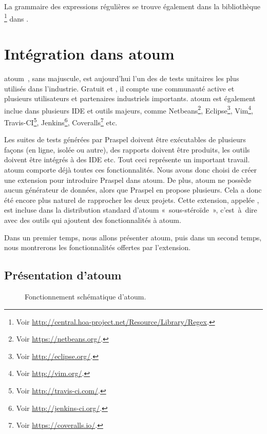 La grammaire des expressions régulières se trouve également dans la bibliothèque
\footnote{Voir
\url{http://central.hoa-project.net/Resource/Library/Regex}.} dans
.

\section{Intégration dans atoum}
\label{section:tools:atoum}

atoum~, sans majuscule, est aujourd'hui l'un des
 de tests unitaires les plus utilisés dans l'industrie. Gratuit et
, il compte une communauté active et plusieurs
utilisateurs et partenaires industriels importants. atoum est également inclue
dans plusieurs IDE et outils majeurs, comme Netbeans\footnote{Voir
\url{https://netbeans.org/}.}, Eclipse\footnote{Voir
\url{http://eclipse.org/}.}, Vim\footnote{Voir \url{http://vim.org/}.},
Travis-CI\footnote{Voir \url{http://travis-ci.com/}.}, Jenkins\footnote{Voir
\url{http://jenkins-ci.org/}.}, Coveralls\footnote{Voir
\url{https://coveralls.io/}.} etc.

Les suites de tests générées par Praspel doivent être exécutables de plusieurs
façons (en ligne, isolée ou autre), des rapports doivent être produits, les
outils doivent être intégrés à des IDE etc. Tout ceci représente un important
travail. atoum comporte déjà toutes ces fonctionnalités. Nous avons donc choisi
de créer une extension pour introduire Praspel dans atoum. De plus, atoum ne
possède aucun générateur de données, alors que Praspel en propose plusieurs.
Cela a donc été encore plus naturel de rapprocher les deux projets. Cette
extension, appelée , est incluse dans la
distribution standard d'atoum «~sous-stéroïde~», c'est~à~dire avec des outils
qui ajoutent des fonctionnalités à atoum.

Dans un premier temps, nous allons présenter atoum, puis dans un second temps,
nous montrerons les fonctionnalités offertes par l'extension.

\subsection{Présentation d'atoum}

\begin{figure}


\caption{\label{figure:tools:atoum} Fonctionnement schématique d'atoum.}

\end{figure}


